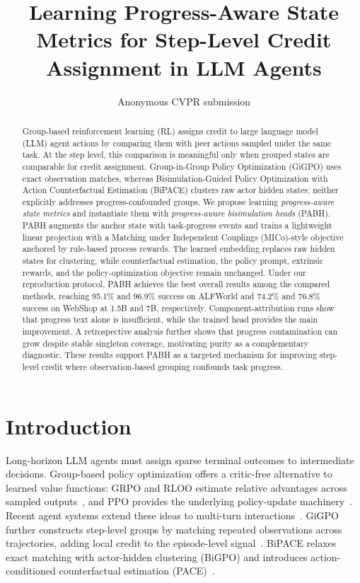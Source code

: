 \documentclass[10pt,twocolumn,letterpaper]{article}
\newcommand{\method}{PABH\xspace}
\begin{document}
\raggedbottom
\title{Learning Progress-Aware State Metrics for Step-Level Credit\\Assignment in LLM Agents}
\author{Anonymous CVPR submission}
\maketitle

\begin{abstract}
Group-based reinforcement learning (RL) assigns credit to large language model (LLM) agent actions by comparing them with peer actions sampled under the same task. At the step level, this comparison is meaningful only when grouped states are comparable for credit assignment. Group-in-Group Policy Optimization (GiGPO) uses exact observation matches, whereas Bisimulation-Guided Policy Optimization with Action Counterfactual Estimation (BiPACE) clusters raw actor hidden states; neither explicitly addresses progress-confounded groups. We propose learning \emph{progress-aware state metrics} and instantiate them with \emph{progress-aware bisimulation heads} (\method). \method augments the anchor state with task-progress events and trains a lightweight linear projection with a Matching under Independent Couplings (MICo)-style objective anchored by rule-based process rewards. The learned embedding replaces raw hidden states for clustering, while counterfactual estimation, the policy prompt, extrinsic rewards, and the policy-optimization objective remain unchanged. Under our reproduction protocol, \method achieves the best overall results among the compared methods, reaching 95.1\% and 96.9\% success on ALFWorld and 74.2\% and 76.8\% success on WebShop at 1.5B and 7B, respectively. Component-attribution runs show that progress text alone is insufficient, while the trained head provides the main improvement. A retrospective analysis further shows that progress contamination can grow despite stable singleton coverage, motivating purity as a complementary diagnostic. These results support \method as a targeted mechanism for improving step-level credit where observation-based grouping confounds task progress.
\end{abstract}

\section{Introduction}
\label{sec:intro}

Long-horizon LLM agents must assign sparse terminal outcomes to intermediate decisions. Group-based policy optimization offers a critic-free alternative to learned value functions: GRPO and RLOO estimate relative advantages across sampled outputs~\cite{grpo,rloo,deepseek_r1}, and PPO provides the underlying policy-update machinery~\cite{ppo,sutton,gae}. Recent agent systems extend these ideas to multi-turn interactions~\cite{ragen,loop,archer}. GiGPO further constructs step-level groups by matching repeated observations across trajectories, adding local credit to the episode-level signal~\cite{gigpo}. BiPACE relaxes exact matching with actor-hidden clustering (BiGPO) and introduces action-conditioned counterfactual estimation (PACE)~\cite{bipace}.
\end{document}
